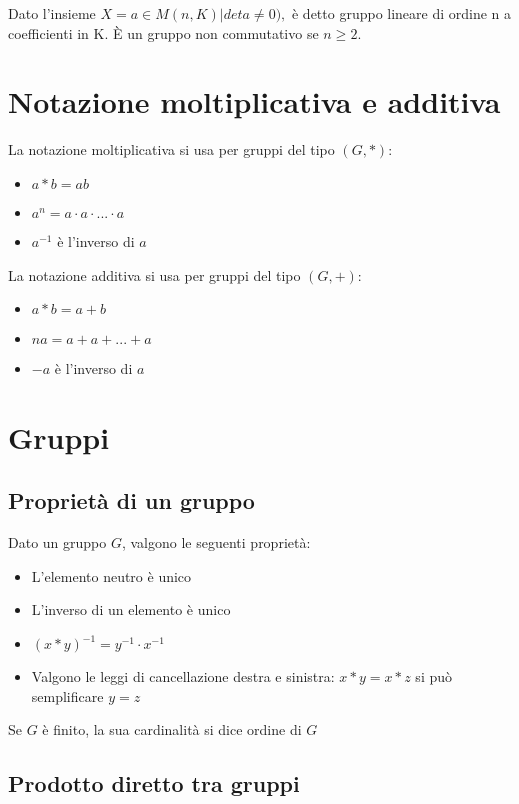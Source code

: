 \documentclass[a4paper, 10pt]{article}
\begin{document}
Dato l’insieme $X={a \in M(n,K) |deta \neq 0}),$ è detto gruppo lineare di ordine n a coefficienti in K.
È un gruppo non commutativo se $n\geq2$.

\section{Notazione moltiplicativa e additiva}

La notazione moltiplicativa si usa per gruppi del tipo $(G, *)$:

\begin{itemize}
	\item $a*b = ab$
	\item $a^n = a \cdot a \cdot ... \cdot a$
	\item $a^{-1}$ è l'inverso di $a$
\end{itemize}

La notazione additiva si usa per gruppi del tipo $(G, +)$:

\begin{itemize}
	\item $a*b = a + b$
	\item $na = a + a + ... + a$
	\item $-a$ è l'inverso di $a$
\end{itemize}

\section{Gruppi}

\subsection{Proprietà di un gruppo}

Dato un gruppo $G$, valgono le seguenti proprietà:
\begin{itemize}
	\item L'elemento neutro è unico
	\item L'inverso di un elemento è unico
	\item $(x * y)^{-1} = y^{-1} \cdot x^{-1}$
	\item Valgono le leggi di cancellazione destra e sinistra: $x * y = x * z$ si può semplificare $y = z$
\end{itemize}

Se $G$ è finito, la sua cardinalità si dice ordine di $G$

\subsection{Prodotto diretto tra gruppi}
\end{document}
